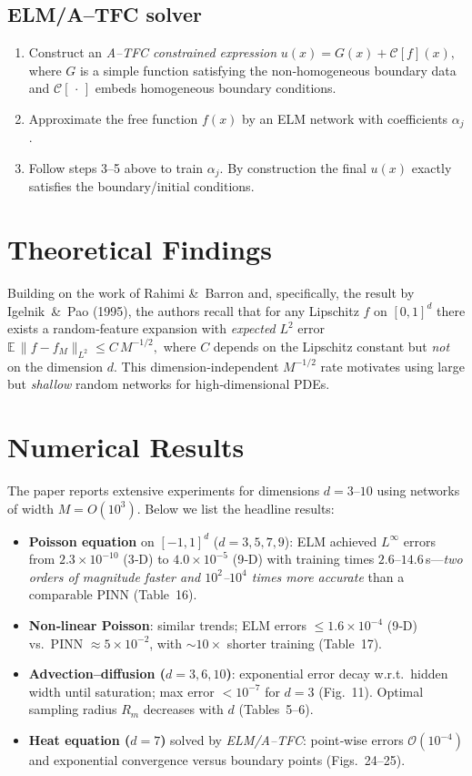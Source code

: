 \documentclass{article}
\begin{document}
\subsection{ELM/A--TFC solver}
\begin{enumerate}
  \item Construct an \emph{A--TFC constrained expression}
  \(
  u(x)=G(x)+\mathcal{C}[f](x),
  \)
  where $G$ is a simple function satisfying the non‑homogeneous boundary data and $\mathcal{C}[\,\cdot\,]$ embeds homogeneous boundary conditions.
  \item Approximate the free function $f(x)$ by an ELM network with coefficients $\alpha_j$.
  \item Follow steps 3--5 above to train $\alpha_j$.  By construction the final $u(x)$ exactly satisfies the boundary/initial conditions.
\end{enumerate}

\section{Theoretical Findings}

Building on the work of Rahimi \& Barron and, specifically, the result by Igelnik \& Pao (1995), the authors recall that for any Lipschitz $f$ on $[0,1]^d$ there exists a random‑feature expansion with \emph{expected} $L^2$ error
\(
\mathbb{E}\,\|f-f_M\|_{L^2}\le C\,M^{-1/2},
\)
where $C$ depends on the Lipschitz constant but \emph{not} on the dimension $d$.  This dimension‑independent $M^{-1/2}$ rate motivates using large but \emph{shallow} random networks for high‑dimensional PDEs.

\section{Numerical Results}

The paper reports extensive experiments for dimensions $d=3$--$10$ using networks of width $M=O(10^3)$.  Below we list the headline results:

\begin{itemize}
  \item \textbf{Poisson equation} on $[-1,1]^d$ ($d=3,5,7,9$): ELM achieved $L^\infty$ errors from $2.3\times10^{-10}$ (3‑D) to $4.0\times10^{-5}$ (9‑D) with training times $2.6$--$14.6$\,s---\emph{two orders of magnitude faster and $10^2$--$10^4$ times more accurate} than a comparable PINN (Table~16).
  \item \textbf{Non‑linear Poisson}: similar trends; ELM errors $\le1.6\times10^{-4}$ (9‑D) vs.\ PINN $\approx 5\times10^{-2}$, with $\sim10\times$ shorter training (Table~17).
  \item \textbf{Advection–diffusion ($d=3,6,10$)}: exponential error decay w.r.t.\ hidden width until saturation; max error $<10^{-7}$ for $d=3$ (Fig.~11).  Optimal sampling radius $R_m$ decreases with $d$ (Tables~5–6).
  \item \textbf{Heat equation ($d=7$)} solved by \emph{ELM/A--TFC}: point‑wise errors $\mathcal{O}(10^{-4})$ and exponential convergence versus boundary points (Figs.~24–25).
\end{itemize}
\end{document}
